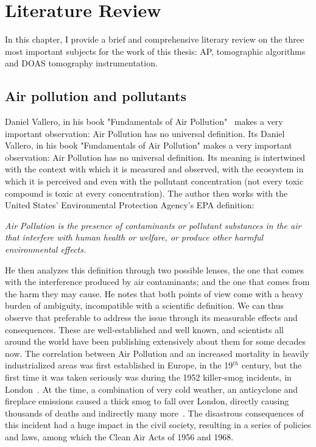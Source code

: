\chapter{Literature Review}
\label{cha:literature_review}

In this chapter, I provide a brief and comprehensive literary review on
the three most important subjects for the work of this thesis: \gls{AP},
tomographic algorithms and \gls{DOAS} tomography instrumentation.

\section{Air pollution and pollutants}%
\label{sec:air_pollution_and_pollutants}

Daniel Vallero, in his book "Fundamentals of Air
Pollution"~\cite{Vallero2014} makes a very important observation: Air
Pollution has no universal definition. Its Daniel Vallero, in his book
"Fundamentals of Air Pollution" makes a very important observation: Air
Pollution has no universal definition. Its meaning is intertwined with
the context with which it is measured and observed, with the ecosystem
in which it is perceived and even with the pollutant concentration (not
every toxic compound is toxic at every concentration). The author then
works with the United States' Environmental Protection Agency's
\gls{EPA} definition:

\begin{minipage}{0.75\textwidth}
    \centering
    \textit{Air Pollution is the presence of contaminants or pollutant
    substances in the air that interfere with human health or welfare,
    or produce other harmful environmental effects.}
\end{minipage}

He then analyzes this definition through two possible lenses, the one
that comes with the interference produced by air contaminants; and the
one that comes from the harm they may cause. He notes that both points
of view come with a heavy burden of ambiguity, incompatible with a
scientific definition. We can thus observe that preferable to address
the issue through its measurable effects and consequences. These are
well-established and well known, and scientists all around the world
have been publishing extensively about them for some decades now. The
correlation between Air Pollution and an increased mortality in heavily
industrialized areas was first established in Europe, in the 19$^{th}$
century, but the first time it was taken seriously was during the 1952
killer-smog incidents, in London~\cite{Platt2007}. At the time, a
combination of very cold weather, an anticyclone and fireplace emissions
caused a thick smog to fall over London, directly causing thousands of
deaths and indirectly many more~\cite{Bell2008,Office2019}. The
disastrous consequences of this incident had a huge impact in the civil
society, resulting in a series of policies and laws, among which the
Clean Air Acts of 1956 and 1968.

